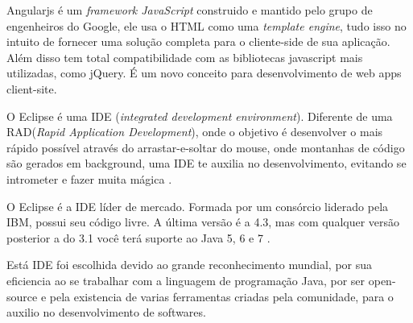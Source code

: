 Angularjs é um \textit{framework JavaScript} construido e mantido pelo grupo de engenheiros do Google, ele usa o HTML como uma \textit{template engine}, tudo isso no intuito de fornecer uma solução completa para o cliente-side de sua aplicação. Além disso tem total compatibilidade com as bibliotecas javascript mais utilizadas, como jQuery. É um novo conceito para desenvolvimento de web apps client-site.\cite{angularjs}\par


O Eclipse é uma IDE (\textit{integrated development environment}). Diferente de uma RAD(\textit{Rapid Application Development}), onde o objetivo é desenvolver o mais rápido possível através do arrastar-e-soltar do mouse, onde montanhas de código são gerados em background, uma IDE te auxilia no desenvolvimento, evitando se intrometer e fazer muita mágica \cite{caelum}.\par

O Eclipse é a IDE líder de mercado. Formada por um consórcio liderado pela IBM, possui seu código livre. A última versão é a 4.3, mas com qualquer versão posterior a do 3.1 você terá suporte ao Java 5, 6 e 7 \cite{caelum}.\par

Está IDE foi escolhida devido ao grande reconhecimento mundial, por sua eficiencia ao se trabalhar com a linguagem de programação Java, por ser open-source e pela existencia de varias ferramentas criadas pela comunidade, para o auxilio no desenvolvimento de softwares.\par